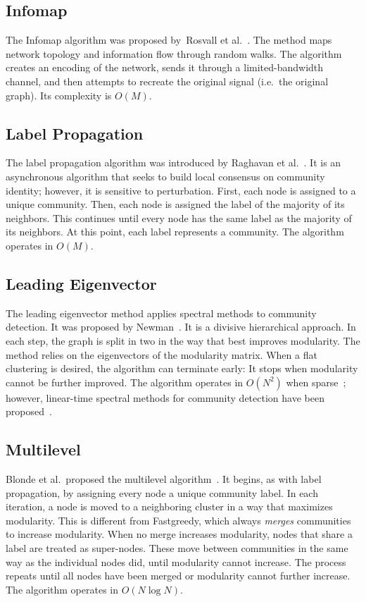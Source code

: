 \subsection{Infomap}

The Infomap algorithm was proposed by~Rosvall et al.~\cite{rosvall2007information, rosvall2009map}. The method maps network topology and information flow through random walks. The algorithm creates an encoding of the network, sends it through a limited-bandwidth channel, and then attempts to recreate the original signal (i.e.\ the original graph). Its complexity is $O(M)$.

\subsection{Label Propagation}
The label propagation algorithm was introduced by Raghavan et al.~\cite{raghavan2007near}. It is an asynchronous algorithm that seeks to build local consensus on community identity; however, it is sensitive to perturbation. First, each node is assigned to a unique community. Then, each node is assigned the label of the majority of its neighbors. This continues until every node has the same label as the majority of its neighbors. At this point, each label represents a community. The algorithm operates in $O(M)$.

\subsection{Leading Eigenvector}

The leading eigenvector method applies spectral methods to community detection. It was proposed by Newman~\cite{newman2006finding}. It is a divisive hierarchical approach. In each step, the graph is split in two in the way that best improves modularity. The method relies on the eigenvectors of the modularity matrix. When a flat clustering is desired, the algorithm can terminate early: It stops when modularity cannot be further improved. The algorithm operates in $O(N^2)$ when sparse~\cite{xie2011community}; however, linear-time spectral methods for community detection have been proposed~\cite{white2005spectral}.

\subsection{Multilevel}

Blonde et al.\ proposed the multilevel algorithm~\cite{blondel2008fast}. It begins, as with label propagation, by assigning every node a unique community label. In each iteration, a node is moved to a neighboring cluster in a way that maximizes modularity. This is different from Fastgreedy, which always \emph{merges} communities to increase modularity. When no merge increases modularity, nodes that share a label are treated as super-nodes. These move between communities in the same way as the individual nodes did, until modularity cannot increase. The process repeats until all nodes have been merged or modularity cannot further increase. The algorithm operates in $O(N\log N)$.

